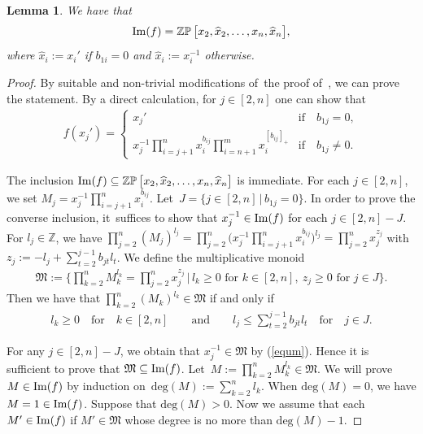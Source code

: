 \documentclass[10pt,a4paper]{amsart}
\numberwithin{equation}{section}
\newtheorem{Lemma}[Theorem]{Lemma}
\begin{document}
\begin{Lemma}\label{lemim}
We have that
\begin{gather*}
\mathop{\rm Im} (f)=\mathop{\mathbb{ZP}}\big[x_2,\widehat{x}_{2},\ldots,x_n,\widehat{x}_{n}\big],
\end{gather*}
where $\widehat{x}_{i}:= x_{i}'$ if $b_{1i}=0$ and $\widehat{x}_{i}:= x_{i}^{-1}$ otherwise.
\end{Lemma}

\begin{proof}
By suitable and non-trivial modifications of~the proof of~\cite[Lemma~6.6]{bfz}, we can prove the statement. By a direct calculation, for $j\in[2,n]$ one can show that
\begin{gather*}
 f(x_{j}') = \begin{cases}
 x_{j}' &\text{if}\quad b_{1j}=0,
 \\
 x_{j}^{-1}\prod\limits_{i=j+1}^{n}x_{i}^{b_{ij}}\prod\limits_{i=n+1}^{m}x_{i}^{[b_{ij}]_+}
 &\text{if} \quad b_{1j}\neq 0.
\end{cases}
\end{gather*}

The inclusion $\mathop{\rm Im}(f)\subseteq\mathop{\mathbb{ZP}}\big[x_2,\widehat{x}_{2},\ldots,x_n,\widehat{x}_{n}\big]$ is immediate. For each $j\in[2,n]$, we set
$M_j=x_{j}^{-1}\prod\limits_{i=j+1}^{n}x_{i}^{b_{ij}}.$ Let~$J=\{j\in[2,n]\,|\, b_{1j}=0\}$. In order to prove the converse inclusion, it~suf\-fi\-ces to show that $x_{j}^{-1}\in\mathop{\rm Im}(f)$ for each $j\in[2,n]-J$\!. For $l_j\in \mathbb{Z}$, we have
$\prod\limits_{j=2}^{n}(M_{j})^{l_j}=\prod\limits_{j=2}^{n}
\Big(x_{j}^{-1}\prod\limits_{i=j+1}^{n}x_{i}^{b_{ij}}\Big)^{l_j}
=\prod\limits_{j=2}^{n}x_{j}^{z_j}$ with $z_j:= {-l_j+\sum\limits_{t=2}^{j-1}b_{jt}l_{t}}$.
We define the multiplicative monoid
\begin{gather*}
\mathfrak{M}:=\Bigg\{\prod\limits_{k=2}^{n}M_{k}^{l_k}=\prod\limits_{j=2}^{n}x_{j}^{z_j} \,|\, l_k\geq0 \text{ for } k\in[2,n],\ z_j\geq0\text{ for } j \in J\Bigg\}.
\end{gather*}
Then we have that $\prod\limits_{k=2}^{n}(M_{k})^{l_k}\in\mathfrak{M}$ if and only if
\begin{gather}\label{equm}
l_k\geq0 \quad\text{for}\quad k\in[2,n]\qquad\text{and}\qquad
l_j\leq \sum\limits_{t=2}^{j-1}b_{jt}l_{t}\quad\text{for}\quad j\in J.
\end{gather}

For any $j\in [2,n]-J$, we obtain that $x_{j}^{-1}\in \mathfrak{M}$ by (\ref{equm}). Hence it is sufficient to prove that $\mathfrak{M}\subseteq \mathop{\rm Im}(f)$. Let~$M:=\prod\limits_{k=2}^{n}M_{k}^{l_k}\in\mathfrak{M}$. We will prove $M\in\mathop{\rm Im}(f)$ by induction on~\mbox{$\text{deg}(M):=\sum\limits_{k=2}^{n}l_{k}$}. When $\text{deg}(M)=0$, we have $M=1\in\mathop{\rm Im}(f)$. Suppose that $\text{deg}(M)>0$. Now we assume that each $M'\in\mathop{\rm Im}(f)$ if $M'\in\mathfrak{M}$ whose degree is no more than $\text{deg}(M)-1$.


\end{proof}
\end{document}

